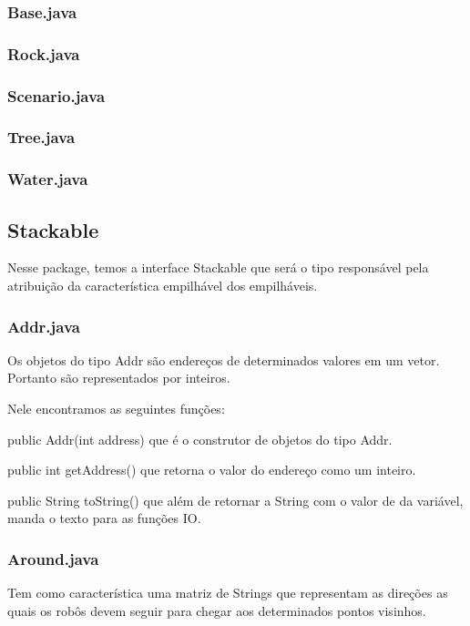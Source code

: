 \documentclass[a4paper]{article}
\begin{document}
		\subsubsection{ Base.java }
		\subsubsection{ Rock.java }
		\subsubsection{ Scenario.java }
		\subsubsection{ Tree.java }
		\subsubsection{ Water.java }
		
	\subsection{Stackable}
		Nesse package, temos a interface Stackable que
		será o tipo responsável pela atribuição da
		característica empilhável dos empilháveis.
		
		\subsubsection { Addr.java }
			Os objetos do tipo Addr são endereços de
			determinados valores em um vetor. Portanto
			são representados por inteiros.
			
			Nele encontramos as seguintes funções:
			
			public Addr(int address)
			que é o construtor de objetos do tipo Addr.
			
			public int getAddress()
			que retorna o valor do endereço como um 
			inteiro.
		
			public String toString()
			que além de retornar a String com o valor de
			da variável, manda o texto para as funções IO.
		
		\subsubsection { Around.java }
			Tem como característica uma matriz de Strings
			que representam as direções as quais os robôs
			devem seguir para chegar aos determinados
			pontos visinhos.
			
\end{document}

